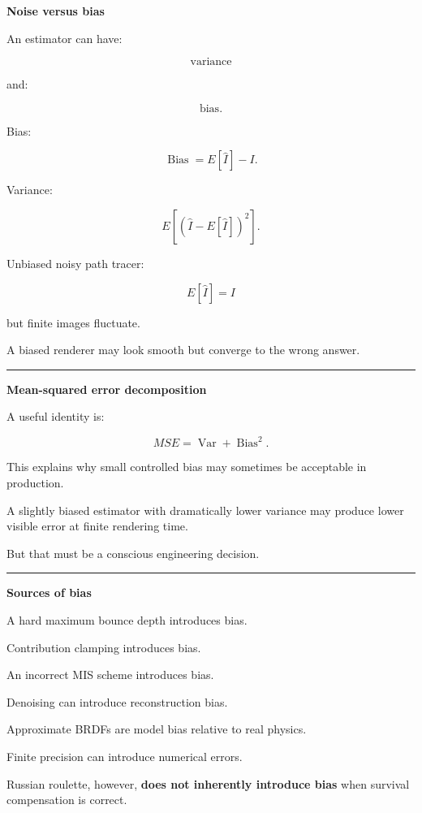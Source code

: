 \textbf{Noise versus bias}

An estimator can have:

\[
\text{variance}
\]

and:

\[
\text{bias}.
\]

Bias:

\[
\boxed{
\operatorname{Bias}
=
E[\hat I]-I.
}
\]

Variance:

\[
\boxed{
E[
(\hat I-E[\hat I])^2
].
}
\]

Unbiased noisy path tracer:

\[
E[\hat I]=I
\]

but finite images fluctuate.

A biased renderer may look smooth but converge to the wrong answer.

\begin{center}\rule{0.5\linewidth}{0.5pt}\end{center}

\textbf{Mean-squared error decomposition}

A useful identity is:

\[
\boxed{
MSE
=
\operatorname{Var}
+
\operatorname{Bias}^2.
}
\]

This explains why small controlled bias may sometimes be acceptable in production.

A slightly biased estimator with dramatically lower variance may produce lower visible error at finite rendering time.

But that must be a conscious engineering decision.

\begin{center}\rule{0.5\linewidth}{0.5pt}\end{center}

\textbf{Sources of bias}

A hard maximum bounce depth introduces bias.

Contribution clamping introduces bias.

An incorrect MIS scheme introduces bias.

Denoising can introduce reconstruction bias.

Approximate BRDFs are model bias relative to real physics.

Finite precision can introduce numerical errors.

Russian roulette, however, \textbf{does not inherently introduce bias} when survival compensation is correct.


